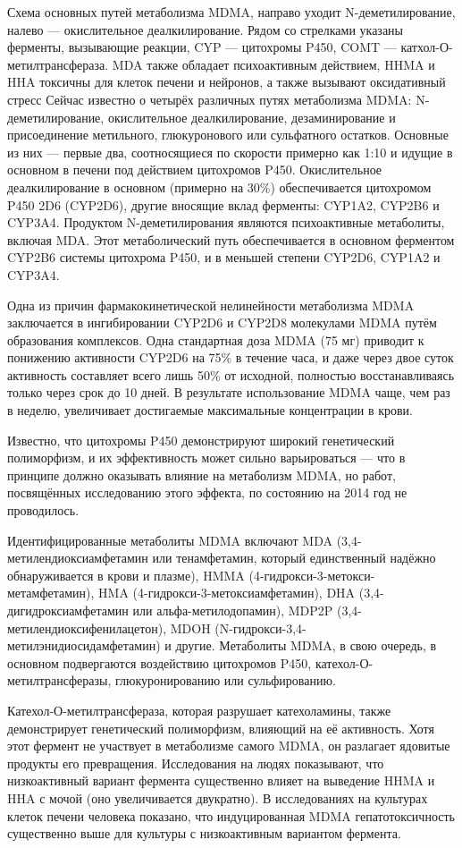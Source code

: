 \documentclass[a4paper,14pt,russian]{report}
\begin{document}
Схема основных путей метаболизма MDMA, направо уходит N-деметилирование, налево — окислительное деалкилирование. Рядом со стрелками указаны ферменты, вызывающие реакции, CYP — цитохромы P450, COMT — катхол-О-метилтрансфераза. MDA также обладает психоактивным действием, HHMA и HHA токсичны для клеток печени и нейронов, а также вызывают оксидативный стресс
Сейчас известно о четырёх различных путях метаболизма MDMA: N-деметилирование, окислительное деалкилирование, дезаминирование и присоединение метильного, глюкуронового или сульфатного остатков. Основные из них — первые два, соотносящиеся по скорости примерно как 1:10 и идущие в основном в печени под действием цитохромов P450. Окислительное деалкилирование в основном (примерно на 30\%) обеспечивается цитохромом P450 2D6 (CYP2D6), другие вносящие вклад ферменты: CYP1A2, CYP2B6 и CYP3A4. Продуктом N-деметилирования являются психоактивные метаболиты, включая MDA. Этот метаболический путь обеспечивается в основном ферментом CYP2B6 системы цитохрома P450, и в меньшей степени CYP2D6, CYP1A2 и CYP3A4.

Одна из причин фармакокинетической нелинейности метаболизма MDMA заключается в ингибировании CYP2D6 и CYP2D8 молекулами MDMA путём образования комплексов. Одна стандартная доза MDMA (75 мг) приводит к понижению активности CYP2D6 на 75\% в течение часа, и даже через двое суток активность составляет всего лишь 50\% от исходной, полностью восстанавливаясь только через срок до 10 дней. В результате использование MDMA чаще, чем раз в неделю, увеличивает достигаемые максимальные концентрации в крови.

Известно, что цитохромы P450 демонстрируют широкий генетический полиморфизм, и их эффективность может сильно варьироваться — что в принципе должно оказывать влияние на метаболизм MDMA, но работ, посвящённых исследованию этого эффекта, по состоянию на 2014 год не проводилось.

Идентифицированные метаболиты MDMA включают MDA (3,4-метилендиоксиамфетамин или тенамфетамин, который единственный надёжно обнаруживается в крови и плазме), HMMA (4-гидрокси-3-метокси-метамфетамин), HMA (4-гидрокси-3-метоксиамфетамин), DHA (3,4-дигидроксиамфетамин или альфа-метилодопамин), MDP2P (3,4-метилендиоксифенилацетон), MDOH (N-гидрокси-3,4-метилэнидиосидамфетамин) и другие. Метаболиты MDMA, в свою очередь, в основном подвергаются воздействию цитохромов P450, катехол-О-метилтрансферазы, глюкуронированию или сульфированию.

Катехол-О-метилтрансфераза, которая разрушает катехоламины, также демонстрирует генетический полиморфизм, влияющий на её активность. Хотя этот фермент не участвует в метаболизме самого MDMA, он разлагает ядовитые продукты его превращения. Исследования на людях показывают, что низкоактивный вариант фермента существенно влияет на выведение HHMA и HHA с мочой (оно увеличивается двукратно). В исследованиях на культурах клеток печени человека показано, что индуцированная MDMA гепатотоксичность существенно выше для культуры с низкоактивным вариантом фермента.
\end{document}
